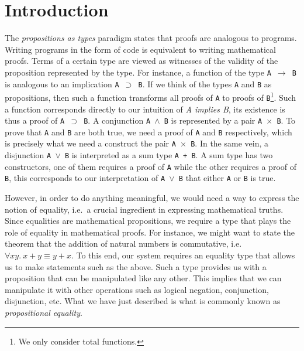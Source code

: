 \documentclass[12pt,twoside,maitrise]{dms}
\theoremstyle{definition}
\numberwithin{equation}{section}
\numberwithin{table}{chapter}
\numberwithin{figure}{chapter}
\newcommand\fn[1] {\texttt{#1}}
\begin{document}



\NoChapterPageNumber
\cleardoublepage
{}


\chapter{Introduction}

The \emph{propositions as types} paradigm states that proofs are analogous to
programs. Writing programs in the form of code is equivalent to writing
mathematical proofs. Terms of a certain type are viewed as witnesses of the
validity of the proposition represented by the type. For instance, a function of
the type \fn{A $\rightarrow$ B} is analogous to an implication \fn{A $\supset$
  B}. If we think of the types \fn{A} and \fn{B} as propositions, then such a
function transforms all proofs of \fn{A} to proofs of \fn{B}\footnote{We only
consider total functions.}. Such a function corresponds directly to our
intuition of \emph{A implies B}, its existence is thus a proof of \fn{A
  $\supset$ B}. A conjunction \fn{A $\wedge$ B} is represented by a pair \fn{A
  $\times$ B}. To prove that \fn{A} and \fn{B} are both true, we need a proof of
\fn{A} and \fn{B} respectively, which is precisely what we need a construct the
pair \fn{A $\times$ B}. In the same vein, a disjunction \fn{A $\vee$ B} is
interpreted as a sum type \fn{A + B}. A sum type has two constructors, one of
them requires a proof of \fn{A} while the other requires a proof of \fn{B}, this
corresponds to our interpretation of \fn{A $\vee$ B} that either \fn{A} or
\fn{B} is true.

However, in order to do anything meaningful, we would need a way to express the
notion of equality, i.e.\ a crucial ingredient in expressing mathematical
truths. Since equalities are mathematical propositions, we require a type that
plays the role of equality in mathematical proofs. For instance, we might want
to state the theorem that the addition of natural numbers is commutative, i.e.
$\forall xy. \ x + y \equiv y + x$. To this end, our system requires an equality
type that allows us to make statements such as the above. Such a type provides
us with a proposition that can be manipulated like any other. This implies that
we can manipulate it with other operations such as logical negation,
conjunction, disjunction, etc. What we have just described is what is commonly
known as \emph{propositional equality}.
\end{document}
